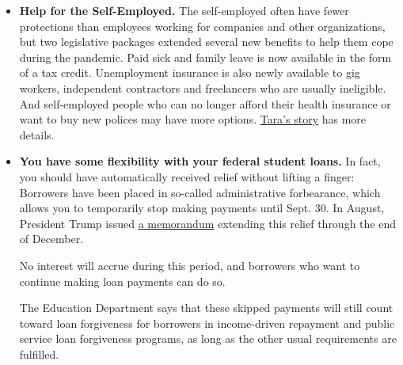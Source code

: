 \begin{itemize}
\item
  \textbf{Help for the Self-Employed.} The self-employed often have
  fewer protections than employees working for companies and other
  organizations, but two legislative packages extended several new
  benefits to help them cope during the pandemic. Paid sick and family
  leave is now available in the form of a tax credit. Unemployment
  insurance is also newly available to gig workers, independent
  contractors and freelancers who are usually ineligible. And
  self-employed people who can no longer afford their health insurance
  or want to buy new polices may have more options.
  \href{https://www.nytimes3xbfgragh.onion/article/self-employed-workers-unemployment-coronavirus-stimulus-package.html}{Tara's
  story} has more details.
\item
  \textbf{You have some flexibility with your federal student loans.} In
  fact, you should have automatically received relief without lifting a
  finger: Borrowers have been placed in so-called administrative
  forbearance, which allows you to temporarily stop making payments
  until Sept. 30. In August, President Trump issued
  \href{https://www.whitehouse.gov/presidential-actions/memorandum-continued-student-loan-payment-relief-covid-19-pandemic/}{a
  memorandum} extending this relief through the end of December.

  No interest will accrue during this period, and borrowers who want to
  continue making loan payments can do so.

  The Education Department says that these skipped payments will still
  count toward loan forgiveness for borrowers in income-driven repayment
  and public service loan forgiveness programs, as long as the other
  usual requirements are fulfilled.


\end{itemize}
